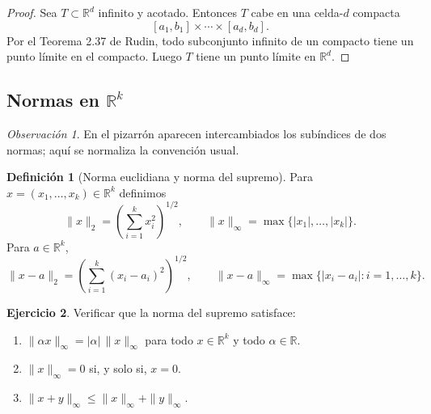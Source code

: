 \documentclass[12pt]{article}
\theoremstyle{definition}
\newtheorem{definition}{Definición}[section]
\newtheorem{exercise}[definition]{Ejercicio}
\theoremstyle{plain}
\theoremstyle{remark}
\newtheorem*{remark}{Observación}
\begin{document}
\begin{proof}
Sea $T\subset\mathbb R^d$ infinito y acotado.
Entonces $T$ cabe en una celda-$d$ compacta
\[
[a_1,b_1]\times\cdots\times[a_d,b_d].
\]
Por el Teorema 2.37 de Rudin, todo subconjunto infinito de un compacto tiene un punto límite en el compacto.
Luego $T$ tiene un punto límite en $\mathbb R^d$.
\end{proof}

\subsection*{Normas en $\mathbb R^k$}

\begin{remark}
En el pizarrón aparecen intercambiados los subíndices de dos normas; aquí se normaliza la convención usual.
\end{remark}

\begin{definition}[Norma euclidiana y norma del supremo]
Para $x=(x_1,\dots,x_k)\in\mathbb R^k$ definimos
\[
\|x\|_2=\left(\sum_{i=1}^k x_i^2\right)^{1/2},
\qquad
\|x\|_\infty=\max\{|x_1|,\dots,|x_k|\}.
\]
Para $a\in\mathbb R^k$,
\[
\|x-a\|_2=\left(\sum_{i=1}^k(x_i-a_i)^2\right)^{1/2},
\qquad
\|x-a\|_\infty=\max\{|x_i-a_i|:i=1,\dots,k\}.
\]
\end{definition}

\begin{exercise}
Verificar que la norma del supremo satisface:
\begin{enumerate}[label=\roman*)]
    \item $\|\alpha x\|_\infty=|\alpha|\,\|x\|_\infty$ para todo $x\in\mathbb R^k$ y todo $\alpha\in\mathbb R$.
    \item $\|x\|_\infty=0$ si, y solo si, $x=0$.
    \item $\|x+y\|_\infty\le \|x\|_\infty+\|y\|_\infty$.
\end{enumerate}
\end{exercise}
\end{document}
